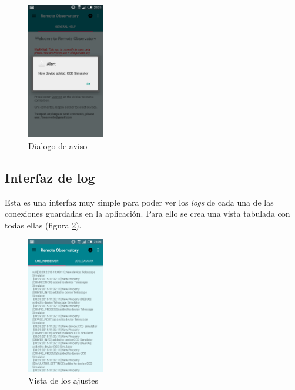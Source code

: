 \begin{figure}[!ht]
  \begin{center}
  \includegraphics[width=0.3\textwidth]{../images/aviso.png}
  \caption{Dialogo de aviso}
  \label{fig:alert_view}
  \end{center}
\end{figure}


\bigskip
\subsection{Interfaz de log}

Esta es una interfaz muy simple para poder ver los \textit{logs} de cada una de las conexiones guardadas en la aplicación. Para ello se crea una vista tabulada con todas ellas (figura \ref{fig:log_view}).

\begin{figure}[!ht]
  \begin{center}
  \includegraphics[width=0.3\textwidth]{../images/log2.png}
  \caption{Vista de los ajustes}
  \label{fig:log_view}
  \end{center}
\end{figure}


